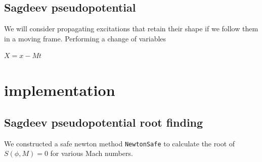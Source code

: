 \documentclass{report}
\newcommand{\bmathc}{\begin{center}\begin{math}}
\newcommand{\emathc}{\end{math}\end{center}}
\begin{document}
\subsection{Sagdeev pseudopotential}
We will consider propagating excitations that retain their shape if we follow them in a moving frame.
Performing a change of variables 
\bmathc
	X = x - M t
\emathc

\section{implementation}
\subsection{Sagdeev pseudopotential root finding}
We constructed a safe newton method {\tt NewtonSafe} to calculate the root of $S(\phi, M) = 0$
for various Mach numbers.
\end{document}
